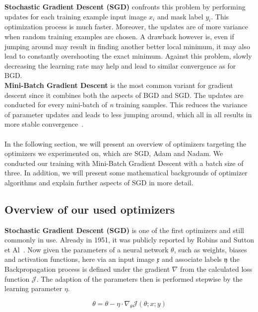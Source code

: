 \textbf{Stochastic Gradient Descent (SGD)} confronts this problem by performing updates for each training example input image $x_i$
and mask label $y_i$.
This optimization process is much faster.
Moreover, the updates are of more variance when random training examples are chosen.
A drawback however is, even if jumping around may result in finding another better local minimum, it may also
lead to constantly overshooting the exact minimum.
Against this problem, slowly decreasing the learning rate may help and lead to similar convergence as for BGD.\\
\textbf{Mini-Batch Gradient Descent} is the most common variant for gradient descent since it combines both the aspects of
BGD and SGD.
The updates are conducted for every mini-batch of \textit{n} training samples.
This reduces the variance of parameter updates and leads to less jumping around, which all in all results in more stable
convergence~\cite{optimizersoverview}.
\\\mbox{}\\
In the following section, we will present an overview of optimizers targeting the optimizers we experimented on, which are
SGD, Adam and Nadam.
We conducted our training with Mini-Batch Gradient Descent with a batch size of three.
In addition, we will present some mathematical backgrounds of optimizer algorithms and explain further aspects of
SGD in more detail.

\subsection*{Overview of our used optimizers}
%
\textbf{Stochastic Gradient Descent (SGD)} is one of the first optimizers and still commonly in use.
Already in 1951, it was publicly reported by Robins and Sutton et Al~\cite{sgd}.
Now given the parameters of a neural network $\theta$, such as weights, biases and activation functions, here via an input image
$\mathfrak{x}$ and associate labels $\mathfrak{y}$ the Backpropagation process is defined under the gradient $\nabla$
from the calculated loss function $\mathcal{J}$.
The adaption of the parameters then is performed stepwise by the learning parameter $\eta$.


\begin{equation}
    \theta = \theta - \eta\cdot\nabla_\theta\mathcal{J}(\theta;x;y)
    \label{eqn:sgd}
\end{equation}

